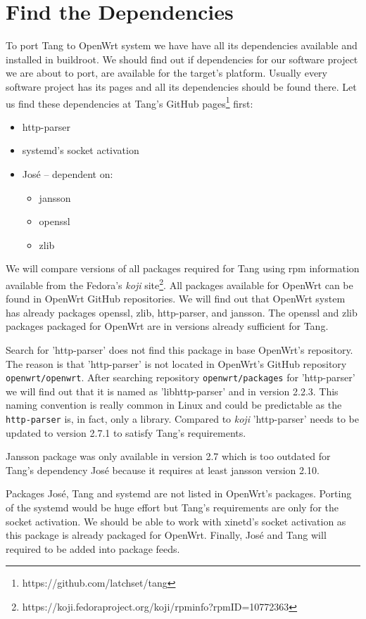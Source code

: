 \section{Find the Dependencies}\label{dependencies}

To port Tang to OpenWrt system we have have all its dependencies available and installed in buildroot.
We should find out if dependencies for our software project we are about to port, are available for the target's platform.
Usually every software project has its pages and all its dependencies should be found there.
Let us find these dependencies at Tang's GitHub pages\footnote{https://github.com/latchset/tang} first:
\begin{itemize}
\item http-parser
\item systemd's socket activation
\item José -- dependent on:
    \begin{itemize}
    \item jansson
    \item openssl
    \item zlib
    \end{itemize}
\end{itemize}
We will compare versions of all packages required for Tang using rpm information available from the Fedora's {\it koji} site\footnote{https://koji.fedoraproject.org/koji/rpminfo?rpmID=10772363}.
All packages available for OpenWrt can be found in OpenWrt GitHub repositories.
We will find out that OpenWrt system has already packages openssl, zlib, http-parser, and jansson.
The openssl and zlib packages packaged for OpenWrt are in versions already sufficient for Tang.

Search for 'http-parser' does not find this package in base OpenWrt's repository.
The reason is that 'http-parser' is not located in OpenWrt's GitHub repository {\tt openwrt/openwrt}.
After searching repository {\tt openwrt/packages} for 'http-parser' we will find out that it is named as 'libhttp-parser' and in version 2.2.3.
This naming convention is really common in Linux and could be predictable as the {\tt http-parser} is, in fact, only a library.
Compared to {\it koji} 'http-parser' needs to be updated to version 2.7.1 to satisfy Tang's requirements.

Jansson package was only available in version 2.7 which is too outdated for Tang's dependency José because it requires at least jansson version 2.10.

Packages José, Tang and systemd are not listed in OpenWrt's packages.
Porting of the systemd would be huge effort but Tang's requirements are only for the socket activation.
We should be able to work with xinetd's socket activation as this package is already packaged for OpenWrt.
Finally, José and Tang will required to be added into package feeds.

